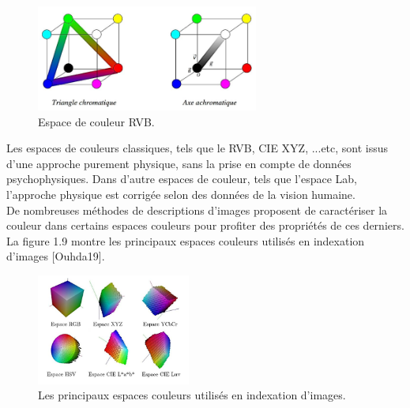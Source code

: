 \begin{figure}[H]
	\label{fig:espaceRVB}
	\centering
	\includegraphics[width=0.65\textwidth]{Figures/espaceRVB} %
	\caption{Espace de couleur RVB.}
\end{figure}

Les espaces de couleurs classiques, tels que le RVB, CIE XYZ, ...etc, sont issus d'une approche purement physique, sans la prise en compte de données psychophysiques. Dans d'autre espaces de couleur, tels que l'espace Lab, l'approche physique est corrigée selon des données de la vision humaine.\\

De nombreuses méthodes de descriptions d'images proposent de caractériser la couleur dans certains espaces couleurs pour profiter des propriétés de ces derniers. La figure 1.9 montre les principaux espaces couleurs utilisés en indexation d’images [Ouhda19].
\begin{figure}[H]
	\label{fig:espaceCouleur}
	\centering
	\includegraphics[width=0.45\textwidth]{Figures/espaceCouleur} %
	\caption{Les principaux espaces couleurs utilisés en indexation d'images.}
	
\end{figure}

